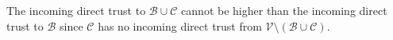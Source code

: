 \begin{proofsketch}
  The incoming direct trust to $\mathcal{B} \cup \mathcal{C}$ cannot be higher than the incoming direct trust to
  $\mathcal{B}$ since $\mathcal{C}$ has no incoming direct trust from
  $\mathcal{V} \setminus \left(\mathcal{B} \cup \mathcal{C}\right)$. %
\end{proofsketch}
